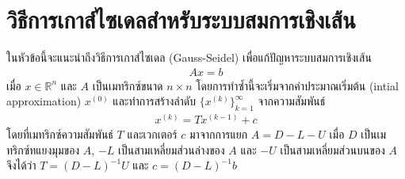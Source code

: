 \section{วิธีการเกาส์ไซเดลสำหรับระบบสมการเชิงเส้น}


\hspace{1cm}  ในหัวข้อนี้จะแนะนำถึงวิธีการเกาส์ไซเดล (Gauss-Seidel) เพื่อแก้ปัญหาระบบสมการเชิงเส้น 
\begin{align}
    Ax = b
    \label{equation:linearquation_system}
\end{align}
เมื่อ $x \in \mathbb{R}^{n}$ และ $A$ เป็นเมทริกซ์ขนาด $n \times n$ โดยการทำซ้ำนี้จะเริ่มจากค่าประมาณเริ่มต้น (intial approximation) $x^{(0)}$ และทำการสร้างลำดับ $\{ x^{(k)} \}_{k=1}^\infty$ จากความสัมพันธ์
\begin{align}
    x^{(k)} = Tx^{(k-1)} + c
\end{align}
โดยที่เมทริกซ์ความสัมพันธ์ $T$ และเวกเตอร์ $c$ มาจากการแยก $A = D - L - U$ เมื่อ $D$ เป็นเมทริกซ์ทแยงมุมของ $A$, $-L$ เป็นสามเหลี่ยมส่วนล่างของ $A$ และ $-U$ เป็นสามเหลี่ยมส่วนบนของ $A$ จึงได้ว่า $T = (D-L)^{-1}U$ และ $c = (D-L)^{-1}b$